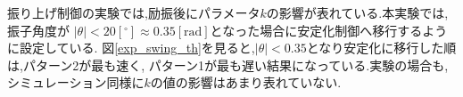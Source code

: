 振り上げ制御の実験では,励振後にパラメータ$k$の影響が表れている.本実験では,振子角度が
$|\theta| < 20[^\circ] \approx 0.35[\mbox{rad}]$となった場合に安定化制御へ移行するように設定している.
図\ref{exp_swing_th}を見ると,$|\theta| < 0.35$となり安定化に移行した順は,パターン2が最も速く,
パターン1が最も遅い結果になっている.実験の場合も,シミュレーション同様に$k$の値の影響はあまり表れていない.


